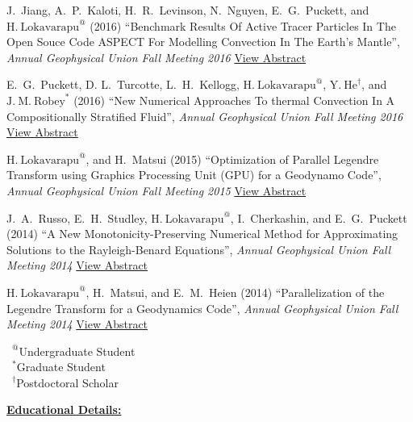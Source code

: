 \documentclass[11pt]{ltxdoc}
\begin{document}
\hangindent 20pt
J.~Jiang, A.~P.~Kaloti, H.~R.~Levinson, N.~Nguyen, E.~G.~Puckett, and $\mathrm{H.~Lokavarapu}^{@}$ (2016) 
``Benchmark Results Of Active Tracer Particles In The Open Souce Code ASPECT For Modelling Convection In The Earth's Mantle'', 
\textit{Annual Geophysical Union Fall Meeting 2016}
\href{http://adsabs.harvard.edu/abs/2016AGUFM.T23C2946J}{View Abstract}

\hangindent 20pt
E.~G.~Puckett, D. L.~Turcotte, L.~H.~Kellogg, $\mathrm{H.~Lokavarapu}^{@}$,  $\mathrm{Y.~He}^{\dagger}$, and $\mathrm{J.~M.~Robey}^{*}$ (2016) 
``New Numerical Approaches To thermal Convection In A Compositionally Stratified Fluid'', 
\textit{Annual Geophysical Union Fall Meeting 2016}
\href{http://adsabs.harvard.edu/abs/2016AGUFMDI23A2589P}{View Abstract}

\hangindent 20pt
$\mathrm{H.~Lokavarapu}^{@}$, and H.~Matsui (2015) 
``Optimization of Parallel Legendre Transform using Graphics Processing Unit (GPU) for a Geodynamo Code'', 
\textit{Annual Geophysical Union Fall Meeting 2015}
\href{http://adsabs.harvard.edu/abs/2015AGUFMGP43B1253L}{View Abstract}

\hangindent 20pt
J.~A.~Russo, E.~H.~Studley, $\mathrm{H.~Lokavarapu}^{@}$, I.~Cherkashin, and E.~G.~Puckett (2014) 
``A New Monotonicity-Preserving Numerical Method for Approximating Solutions to the Rayleigh-Benard Equations'', 
\textit{Annual Geophysical Union Fall Meeting 2014}
\href{http://adsabs.harvard.edu/abs/2014AGUFMDI11A4258R}{View Abstract}

\hangindent 20pt
$\mathrm{H.~Lokavarapu}^{@}$, H.~Matsui, and E.~M.~Heien (2014) 
``Parallelization of the Legendre Transform for a Geodynamics Code'', 
\textit{Annual Geophysical Union Fall Meeting 2014}
\href{http://adsabs.harvard.edu/abs/2014AGUFMDI11A4255L}{View Abstract}

\vskip 18pt

$\phantom{0}^@$Undergraduate Student        \\
$\phantom{0}^*$Graduate Student             \\
$\phantom{0}^{\dagger}$Postdoctoral Scholar


\clearpage


\newpage

\begin{center}
  \textbf{\underline{Educational Details:}}
\end{center}
\end{document}
